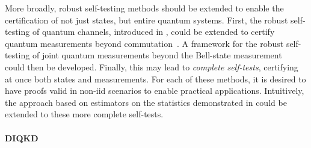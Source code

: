 \medbreak

More broadly, robust self-testing methods should be extended to enable the certification of not just states, but entire quantum systems.
First, the robust self-testing of quantum channels, introduced in \cite{Sekatski2018}, could be extended to certify quantum measurements beyond commutation~\cite{Kaniewski2017}.
A framework for the robust self-testing of joint quantum measurements beyond the Bell-state measurement~\cite{Bancal2018,Renou2018} could then be developed.
Finally, this may lead to \textit{complete self-tests}, certifying at once both states and measurements.
For each of these methods, it is desired to have proofs valid in non-\acrshort{iid} scenarios to enable practical applications.
Intuitively, the approach based on estimators on the statistics demonstrated in \cite{Bancal2021} could be extended to these more complete self-tests. 



\paragraph{DIQKD}


